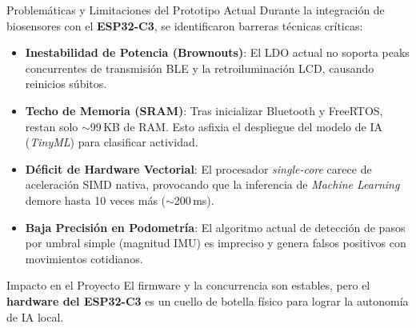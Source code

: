 \documentclass[aspectratio=169, 10pt]{beamer}
\begin{document}
\begin{frame}{Problem\'aticas y Limitaciones del Prototipo Actual}
    \vspace{-0.2cm}
    \footnotesize
    Durante la integraci\'on de biosensores con el \textbf{ESP32-C3}, se identificaron barreras t\'ecnicas cr\'iticas:
    \vspace{0.15cm}
    \begin{itemize}\itemsep0.15cm
        \item \alert{\textbf{Inestabilidad de Potencia (Brownouts)}}: El LDO actual no soporta peaks concurrentes de transmisi\'on BLE y la retroiluminaci\'on LCD, causando reinicios s\'ubitos.
        \item \alert{\textbf{Techo de Memoria (SRAM)}}: Tras inicializar Bluetooth y FreeRTOS, restan solo $\sim$99\,KB de RAM. Esto asfixia el despliegue del modelo de IA (\textit{TinyML}) para clasificar actividad.
        \item \alert{\textbf{D\'eficit de Hardware Vectorial}}: El procesador \textit{single-core} carece de aceleraci\'on SIMD nativa, provocando que la inferencia de \textit{Machine Learning} demore hasta 10 veces m\'as ($\sim$200\,ms).
        \item \alert{\textbf{Baja Precisi\'on en Podometr\'ia}}: El algoritmo actual de detecci\'on de pasos por umbral simple (magnitud IMU) es impreciso y genera falsos positivos con movimientos cotidianos.
    \end{itemize}
    \vspace{0.25cm}
    \centering
    \begin{minipage}{0.9\textwidth}
        \begin{alertblock}{Impacto en el Proyecto}
            \scriptsize El firmware y la concurrencia son estables, pero el \textbf{hardware del ESP32-C3} es un cuello de botella f\'isico para lograr la autonom\'ia de IA local.
        \end{alertblock}
    \end{minipage}
\end{frame}
\end{document}
